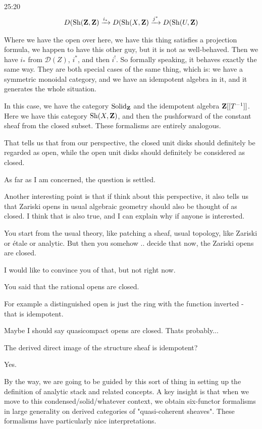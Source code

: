 \begin{unfinished}{25:20}
\begin{align*}
D(\operatorname{Sh}(\mathbf Z, \mathbf Z) \xrightarrow{i_\ast} D(\operatorname{Sh}(X, \mathbf Z) \xrightarrow{j^\ast} D(\operatorname{Sh}(U, \mathbf Z)
\end{align*}

Where we have the open over here, we have this thing satisfies a projection formula, we happen to have this other guy, but it is not as well-behaved. 
Then we have $i_\ast$ from $\mathcal{D}(Z)$, $i^\ast$, and then $i^!$. 
So formally speaking, it behaves exactly the same way. They are both special cases of the same thing, which is: we have a symmetric monoidal category, and we have an idempotent algebra in it, and it generates the whole situation.

In this case, we have the category $\mathrm{Solid}_\mathbf Z$ and the idempotent algebra $\mathbf Z[[T^{-1}]]$. Here we have this category $\operatorname{Sh}(X,\mathbf Z)$, and then the pushforward of the constant sheaf from the closed subset. These formalisms are entirely analogous.

That tells us that from our perspective, the closed unit disks should definitely be regarded as open, while the open unit disks should definitely be considered as closed. 

As far as I am concerned, the question is settled. 

Another interesting point is that if think about this perspective, it also tells us that Zariski opens in usual algebraic geometry should also be thought of as closed. I think that is also true, and I can explain why if anyone is interested.

\ques You start from the usual theory, like patching a sheaf, usual topology, like Zariski or étale or analytic. But then you somehow .. decide that now, the Zariski opens are closed.

\ans I would like to convince you of that, but not right now. 


You said that the rational opens are closed.

For example a distinguished open is just the ring with the function inverted - that is idempotent.

\ans Maybe I should say quasicompact opens are closed. Thats probably...

%
\ques The derived direct image of the structure sheaf is idempotent?

\ans Yes.

By the way, we are going to be guided by this sort of thing in setting up the definition of analytic stack and related concepts. A key insight is that when we move to this condensed/solid/whatever context, we obtain six-functor formalisms in large generality on derived categories of "quasi-coherent sheaves". These formalisms have particularly nice interpretations.


\end{unfinished}
